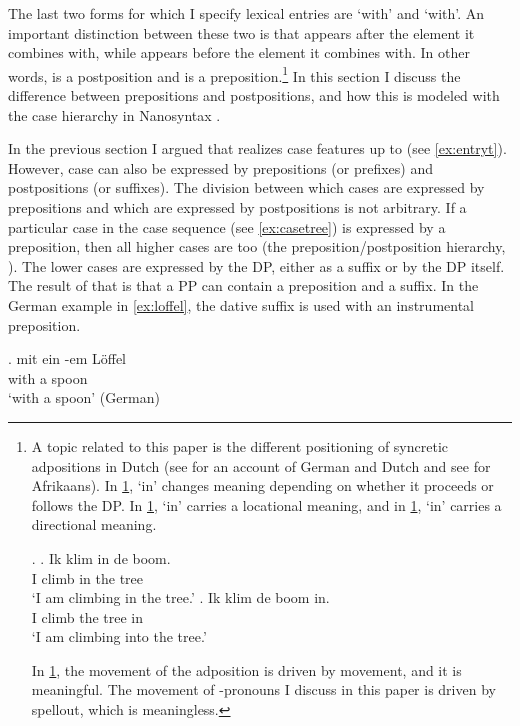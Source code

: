 \documentclass[11pt,a4paper]{article}
\begin{document}
The last two forms for which I specify lexical entries are  `with' and  `with'. An important distinction between these two is that  appears after the element it combines with, while  appears before the element it combines with. In other words,  is a postposition and  is a preposition.\footnote{
A topic related to this paper is the different positioning of syncretic adpositions in Dutch (see \citet{caha2010} for an account of German and Dutch and see \citet{pretorius2017} for Afrikaans). In \ref{ex:dutchin},  `in' changes meaning depending on whether it proceeds or follows the DP. In \ref{ex:dutch-in-loc},  `in' carries a locational meaning, and in \ref{ex:dutch-in-dir},  `in' carries a directional meaning.

\ex.\label{ex:dutchin}
\ag. Ik klim in de boom.\\
 I climb in the tree\\
 `I am climbing in the tree.'\label{ex:dutch-in-loc}
\bg. Ik klim de boom in.\\
 I climb the tree in\\
 `I am climbing into the tree.'\label{ex:dutch-in-dir}

In \ref{ex:dutchin}, the movement of the adposition is driven by movement, and it is meaningful. The movement of -pronouns I discuss in this paper is driven by spellout, which is meaningless.}
In this section I discuss the difference between prepositions and postpositions, and how this is modeled with the case hierarchy in Nanosyntax \citep{caha2009}.

In the previous section I argued that  realizes case features up to  (see \ref{ex:entryt}). However, case can also be expressed by prepositions (or prefixes) and postpositions (or suffixes). The division between which cases are expressed by prepositions and which are expressed by postpositions is not arbitrary. If a particular case in the case sequence (see \ref{ex:casetree}) is expressed by a preposition, then all higher cases are too (the preposition/postposition hierarchy, ). The lower cases are expressed by the DP, either as a suffix or by the DP itself.
The result of that is that a PP can contain a preposition and a suffix. In the German example in \ref{ex:loffel}, the dative suffix is used with an instrumental preposition.

\exg. mit ein -em Löffel\\
with a  spoon\\
`with a spoon' \hfill (German)\label{ex:loffel}
\end{document}

